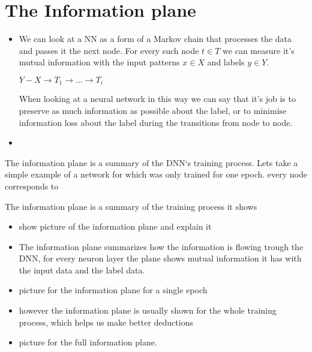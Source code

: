 \section{The Information plane}

\begin{itemize}
  \item{
      We can look at a NN as a form of a Markov chain that processes the data
      and passes it the next node. For every such node $ t \in T $ we can
      measure it's mutual information with the input patterns $ x \in X $ and
      labels $ y \in Y $. 
      
      $ Y - X \rightarrow T_1 \rightarrow ... \rightarrow T_i  $
      
      When looking at a neural network in this way we can
      say that it's job is to preserve as much information as possible about the
      label, or to minimise information loss about the label during the
      transitions from node to node. 
    }
  \item{
      
    }
\end{itemize}

The information plane is a summary of the DNN`s training process. Lets take a
simple example of a network for which was only trained for one epoch. every node
corresponds to  





















The information plane is a summary of the training process it shows 

\begin{itemize}
  \item{
      show picture of the information plane and explain it
    }
  \item{
      The information plane summarizes how the information is flowing trough the
      DNN, for every neuron layer the plane shows mutual information it has with
      the input data and the label data. 
    }
  \item{
      picture for the information plane for a single epoch
    }
  \item{
      however the information plane is usually shown for the whole training
      process, which helps us make better deductions 
    }
  \item{
      picture for the full information plane.
    }
\end{itemize}
